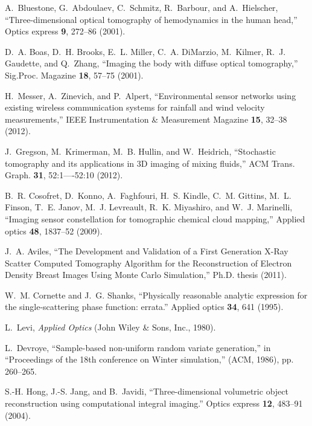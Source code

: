 \documentclass[10pt,letterpaper]{article}
\begin{document}
\begin{thebibliography}{10}
A.~Bluestone, G.~Abdoulaev, C.~Schmitz, R.~Barbour, and A.~Hielscher,
  \enquote{{Three-dimensional optical tomography of hemodynamics in the human
  head},} Optics express \textbf{9}, 272--86 (2001).

D.~A. Boas, D.~H. Brooks, E.~L. Miller, C.~A. DiMarzio, M.~Kilmer, R.~J.
  Gaudette, and Q.~Zhang, \enquote{{Imaging the body with diffuse optical
  tomography},} Sig.Proc. Magazine \textbf{18}, 57--75 (2001).

H.~Messer, A.~Zinevich, and P.~Alpert, \enquote{{Environmental sensor networks
  using existing wireless communication systems for rainfall and wind velocity
  measurements},} IEEE Instrumentation \& Measurement Magazine \textbf{15},
  32--38 (2012).

J.~Gregson, M.~Krimerman, M.~B. Hullin, and W.~Heidrich, \enquote{{Stochastic
  tomography and its applications in 3D imaging of mixing fluids},} ACM Trans.
  Graph. \textbf{31}, 52:1----52:10 (2012).

B.~R. Cosofret, D.~Konno, A.~Faghfouri, H.~S. Kindle, C.~M. Gittins, M.~L.
  Finson, T.~E. Janov, M.~J. Levreault, R.~K. Miyashiro, and W.~J. Marinelli,
  \enquote{{Imaging sensor constellation for tomographic chemical cloud
  mapping},} Applied optics \textbf{48}, 1837--52 (2009).

J.~A. Aviles, \enquote{{The Development and Validation of a First Generation
  X-Ray Scatter Computed Tomography Algorithm for the Reconstruction of
  Electron Density Breast Images Using Monte Carlo Simulation},} Ph.D. thesis
  (2011).

W.~M. Cornette and J.~G. Shanks, \enquote{{Physically reasonable analytic
  expression for the single-scattering phase function: errata.}} Applied optics
  \textbf{34}, 641 (1995).

L.~Levi, \emph{{Applied Optics}} (John Wiley \& Sons, Inc., 1980).

L.~Devroye, \enquote{{Sample-based non-uniform random variate generation},} in
  \enquote{Proceedings of the 18th conference on Winter simulation,}  (ACM,
  1986), pp. 260--265.

S.-H. Hong, J.-S. Jang, and B.~Javidi, \enquote{{Three-dimensional volumetric
  object reconstruction using computational integral imaging.}} Optics express
  \textbf{12}, 483--91 (2004).


\end{thebibliography}
\end{document}
